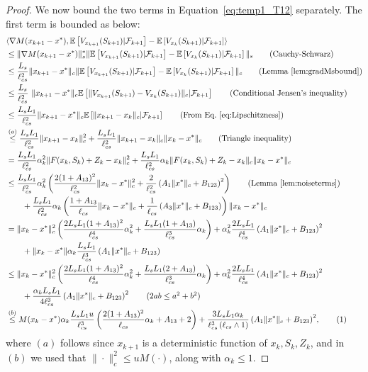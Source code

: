 \documentclass{article}
\newcommand{\numberthis}{\addtocounter{equation}{1}\tag{\theequation}}
\newcommand{\lrp}[1]{\left( #1 \right)}
\newcommand{\lrs}[1]{\left[ #1 \right]}
\newcommand{\E}[1]{\mathbb{E}\lrs{#1}}
\newcommand{\lcs}{\ell_{cs}}
\newcommand{\xk}{x_k}
\begin{document}
\begin{proof}
    We now bound the two terms in Equation~\eqref{eq:temp1_T12} separately. The first term is bounded as below:
    \begin{align*}
        &\langle \nabla M(x_{k+1} - x^*), \E{V_{x_{k+1}}(S_{k+1}) | \mathcal F_{k+1}} - \E{ V_{x_k}(S_{k+1}) | \mathcal F_{k+1}}\rangle\\
        &\le  \|\nabla M(x_{k+1} - x^*)\|^*_s   \|\E{V_{x_{k+1}}(S_{k+1}) | \mathcal F_{k+1}} - \E{ V_{x_k}(S_{k+1}) | \mathcal F_{k+1} }\|_s \tag{Cauchy-Schwarz} \\
        &\le  \frac{L_s}{\lcs^2} \|x_{k+1}-x^*\|_c  \|\E{V_{x_{k+1}}(S_{k+1}) | \mathcal F_{k+1}} - \E{ V_{x_k}(S_{k+1}) | \mathcal F_{k+1}}\|_c \tag{Lemma~\ref{lem:gradMsbound}}\\
        &\le \frac{L_s}{\lcs^2} \ \|x_{k+1} - x^*\|_c  \E{\| V_{x_{k+1}}(S_{k+1}) - V_{x_k}(S_{k+1})\|_c | \mathcal F_{k+1}} \tag{Conditional Jensen's inequality}\\
        &\le  \frac{L_sL_1}{\lcs^2}\|x_{k+1} - x^*\|_c  \E{\| x_{k+1} - x_k \|_c  | \mathcal F_{k+1}} \tag{From Eq.~\eqref{eq:Lipschitzness}}\\
        &\overset{(a)}{\le} \frac{L_sL_1}{\lcs^2} \|x_{k+1} - x_k\|^2_c + \frac{L_sL_1}{\lcs^2}\|x_{k+1} - x_k\|_c \|x_k - x^*\|_c \tag{Triangle inequality}\\
        &= \frac{L_s L_1}{\lcs^2}  \alpha^2_k \|F(x_k, S_k) + Z_k - x_k\|^2_c + \frac{L_sL_1}{\lcs^2} \alpha_k \|F(x_k, S_k) + Z_k - x_k \|_c \|x_k - x^*\|_c\\
        &\le \frac{L_s L_1}{\lcs^2} \alpha^2_k \lrp{\frac{2(1+A_{13})^2}{\lcs^2} \|\xk - x^*\|^2_c + \frac{2}{\lcs^2} \lrp{A_{1} \|x^*\|_c  + B_{123}}^2} \tag{Lemma~\ref{lem:noiseterms}}\\
        &\qquad + \frac{L_s L_1}{\lcs^2} \alpha_k \lrp{\frac{1+A_{13}}{\lcs} \|\xk - x^*\|_c + \frac{1}{\lcs} \lrp{A_{3} \|x^*\|_c  + B_{123}}} \|x_k - x^*\|_c \\
        &= \|\xk - x^*\|^2_c \lrp{\frac{2 L_s L_1 (1+A_{13})^2}{\lcs^4} \alpha^2_k + \frac{L_s L_1 (1+A_{13})}{\lcs^3} \alpha_k} + \alpha^2_k \frac{2 L_s L_1}{\lcs^4}\lrp{A_{1}\|x^*\|_c + B_{123}}^2\\ 
            &\qquad + \|x_k - x^*\| \alpha_k\frac{L_s L_1}{\lcs^3} \lrp{A_{1}\|x^*\|_c + B_{123}} \\
        &\le \|\xk - x^*\|^2_c \lrp{\frac{2 L_s L_1 (1+A_{13})^2}{\lcs^4} \alpha^2_k + \frac{L_s L_1 (2+A_{13})}{\lcs^3} \alpha_k} + \alpha^2_k \frac{2 L_s L_1}{\lcs^4}\lrp{A_{1}\|x^*\|_c + B_{123}}^2\\ 
            &\qquad + \frac{\alpha_k L_s L_1}{4\lcs^3}  \lrp{A_{1}\|x^*\|_c + B_{123}}^2 \tag{$2ab \le a^2 + b^2$}\\
        &\overset{(b)}{\le} M(\xk - x^*) \alpha_k \frac{L_sL_1 u}{\lcs^3}\lrp{\frac{2 (1+A_{13})^2}{\lcs} \alpha_k + A_{13} + 2} +  \frac{3L_s L_1 \alpha_k}{\lcs^3\lrp{\lcs \wedge 1}}\lrp{A_{1}\|x^*\|_c + B_{123}}^2\!,\numberthis\label{eq:boundonfirstterm}
    \end{align*}
    where $(a)$ follows since $x_{k+1}$ is a deterministic function of $x_k, S_k, Z_k$, and in $(b)$ we used that $ \|\cdot\|^2_c \le u M(\cdot)$, along with $\alpha_k \le 1$.


\end{proof}
\end{document}
